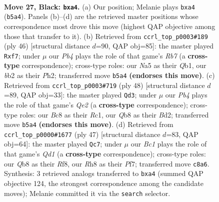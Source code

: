 \documentclass[11pt]{article}
\begin{document}
\clearpage

\begin{figure}[p]\centering
\begin{subfigure}{0.46\textwidth}\centering
\resizebox{\linewidth}{!}{%
\newchessgame
\chessboard[
  setfen={rqb1k2r/p3b1pp/8/np1p1B2/P2P3P/4P1P1/1B1N2K1/1Q2R3 b - - 0 27},
  showmover=false,
  pgfstyle=straightmove, color=movearrow, markmove={b5-a4}
]}
\caption{}
\end{subfigure}\hfill
\begin{subfigure}{0.46\textwidth}\centering
\resizebox{\linewidth}{!}{%
\newchessgame
\chessboard[
  setfen={r2q2k1/pR3r2/5b1p/2pP1pp1/b2P4/B4P1N/P6P/1Q2R2K w - - 0 24},
  showmover=false,
  pgfstyle=straightmove, color=movearrow, markmove={b7-f7}
]}
\caption{}
\end{subfigure}
\\[4pt]
\begin{subfigure}{0.46\textwidth}\centering
\resizebox{\linewidth}{!}{%
\newchessgame
\chessboard[
  setfen={1q2r1k1/1p3bb1/p1n3pp/5p2/8/N7/PP1BQPPP/2RR2K1 w - - 4 25},
  showmover=false,
  pgfstyle=straightmove, color=movearrow, markmove={e2-d3}
]}
\caption{}
\end{subfigure}\hfill
\begin{subfigure}{0.46\textwidth}\centering
\resizebox{\linewidth}{!}{%
\newchessgame
\chessboard[
  setfen={b2q1rk1/5p2/4pb1p/n5p1/3NB2P/2P3P1/2Q2P2/2B2RK1 b - - 0 24},
  showmover=false,
  pgfstyle=straightmove, color=movearrow, markmove={d8-c7}
]}
\caption{}
\end{subfigure}
\caption{\textbf{Move 27, Black: \texttt{bxa4}.} (a) Our position; Melanie plays \texttt{bxa4} (\texttt{b5a4}). Panels (b)--(d) are the retrieved master positions whose correspondence most drove this move (highest QAP objective among those that transfer to it). (b) Retrieved from \texttt{ccrl\_top\_p0003\#189} (ply 46) [structural distance $d$=90, QAP obj=85]: the master played \texttt{Rxf7}; under $\mu$ our \emph{Pb4} plays the role of that game's \emph{Rb7} (a \textbf{cross-type} correspondence); cross-type roles: our \emph{N}a5 as their \emph{Q}b1, our \emph{b}b2 as their \emph{P}h2; transferred move \texttt{b5a4} \textbf{(endorses this move)}. (c) Retrieved from \texttt{ccrl\_top\_p0003\#719} (ply 48) [structural distance $d$=89, QAP obj=33]: the master played \texttt{Qd3}; under $\mu$ our \emph{Pb4} plays the role of that game's \emph{Qe2} (a \textbf{cross-type} correspondence); cross-type roles: our \emph{B}c8 as their \emph{R}c1, our \emph{Q}b8 as their \emph{B}d2; transferred move \texttt{b5a4} \textbf{(endorses this move)}. (d) Retrieved from \texttt{ccrl\_top\_p0000\#1677} (ply 47) [structural distance $d$=83, QAP obj=64]: the master played \texttt{Qc7}; under $\mu$ our \emph{Bc1} plays the role of that game's \emph{Qd1} (a \textbf{cross-type} correspondence); cross-type roles: our \emph{Q}b8 as their \emph{R}f8, our \emph{R}h8 as their \emph{P}f7; transferred move \texttt{c8a6}. Synthesis: 3 retrieved analogs transferred to \texttt{bxa4} (summed QAP objective 124, the strongest correspondence among the candidate moves); Melanie committed it via the \texttt{search} selector.}
\label{fig:thought-m53}
\end{figure}
\end{document}

